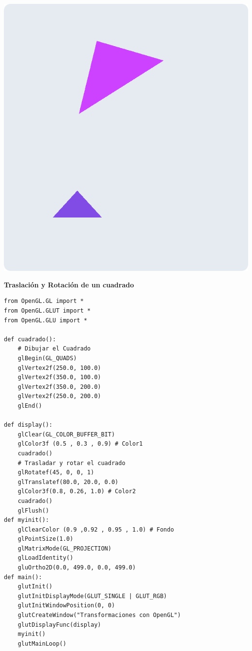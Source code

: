 \documentclass[a4paper]{article}
\begin{document}
\begin{center}
\includegraphics[width=14cm]{./src/triangulo.png}
\end{center}
\newpage
\Large{\textbf{Traslación y Rotación de un cuadrado}}\\[-0.4cm]
\begin{center}
\begin{mycodeboxl}
\begin{lstlisting}
from OpenGL.GL import *
from OpenGL.GLUT import *
from OpenGL.GLU import *

def cuadrado():
    # Dibujar el Cuadrado 
    glBegin(GL_QUADS)
    glVertex2f(250.0, 100.0)
    glVertex2f(350.0, 100.0)
    glVertex2f(350.0, 200.0)
    glVertex2f(250.0, 200.0)
    glEnd()

def display():
    glClear(GL_COLOR_BUFFER_BIT)
    glColor3f (0.5 , 0.3 , 0.9) # Color1
    cuadrado()
    # Trasladar y rotar el cuadrado
    glRotatef(45, 0, 0, 1)
    glTranslatef(80.0, 20.0, 0.0)
    glColor3f(0.8, 0.26, 1.0) # Color2
    cuadrado()
    glFlush() 
def myinit():
    glClearColor (0.9 ,0.92 , 0.95 , 1.0) # Fondo
    glPointSize(1.0)
    glMatrixMode(GL_PROJECTION)
    glLoadIdentity() 
    gluOrtho2D(0.0, 499.0, 0.0, 499.0)
def main():
    glutInit()
    glutInitDisplayMode(GLUT_SINGLE | GLUT_RGB)
    glutInitWindowPosition(0, 0)
    glutCreateWindow("Transformaciones con OpenGL")
    glutDisplayFunc(display)
    myinit()
    glutMainLoop()
\end{lstlisting}
\end{mycodeboxl}
\end{center}
\end{document}

